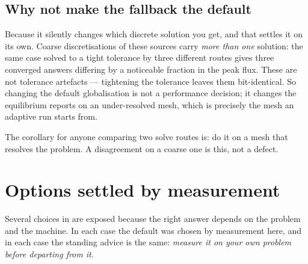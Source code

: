 \subsection{Why not make the fallback the default}

Because it silently changes which discrete solution you get, and that settles it
on its own. Coarse discretisations of these sources carry \emph{more than one}
solution: the same case solved to a tight tolerance by three different routes
gives three converged answers differing by a noticeable fraction in the peak
flux. These are not tolerance artefacts --- tightening the tolerance leaves them
bit-identical. So changing the default globalisation is not a performance
decision; it changes the equilibrium {\meq} reports on an under-resolved mesh,
which is precisely the mesh an adaptive run starts from.

The corollary for anyone comparing two solve routes is: do it on a mesh that
resolves the problem. A disagreement on a coarse one is this, not a defect.

\section{Options settled by measurement}

Several choices in {\meq} are exposed because the right answer depends on the
problem and the machine. In each case the default was chosen by measurement
here, and in each case the standing advice is the same: \emph{measure it on your
own problem before departing from it.}

